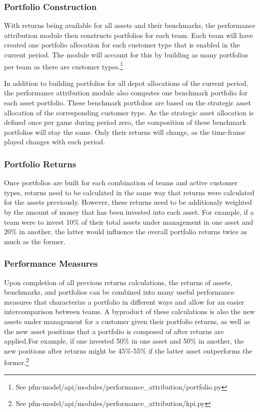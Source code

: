 \subsubsection{Portfolio Construction}
With returns being available for all assets and their benchmarks, the performance attribution module then constructs portfolios for each team. Each team will have created one portfolio allocation for each customer type that is enabled in the current period. The module will account for this by building as many portfolios per team as there are customer types.\footnote{See pfm-model/api/modules/performance\_attribution/portfolio.py}

In addition to building portfolios for all depot allocations of the current period, the performance attribution module also computes one benchmark portfolio for each asset portfolio. These benchmark portfolios are based on the strategic asset allocation of the corresponding customer type. As the strategic asset allocation is defined once per game during period zero, the composition of these benchmark portfolios will stay the same. Only their returns will change, as the time-frame played changes with each period.

\subsubsection{Portfolio Returns}
Once portfolios are built for each combination of teams and active customer types, returns need to be calculated in the same way that returns were calculated for the assets previously. However, these returns need to be additionaly weighted by the amount of money that has been invested into each asset. For example, if a team were to invest 10\% of their total assets under management in one asset and 20\% in another, the latter would influence the overall portfolio returns twice as much as the former.

\subsubsection{Performance Measures}
Upon completion of all previous returns calculations, the returns of assets, benchmarks, and portfolios can be combined into many useful performance measures that characterize a portfolio in different ways and allow for an easier intercomparison between teams. A byproduct of these calculations is also the new assets under management for a customer given their portfolio returns, as well as the new asset positions that a portfolio is composed of after returns are applied.For example, if one invested 50\% in one asset and 50\% in another, the new positions after returns might be 45\%-55\% if the latter asset outperforms the former.\footnote{See pfm-model/api/modules/performance\_attribution/kpi.py}

